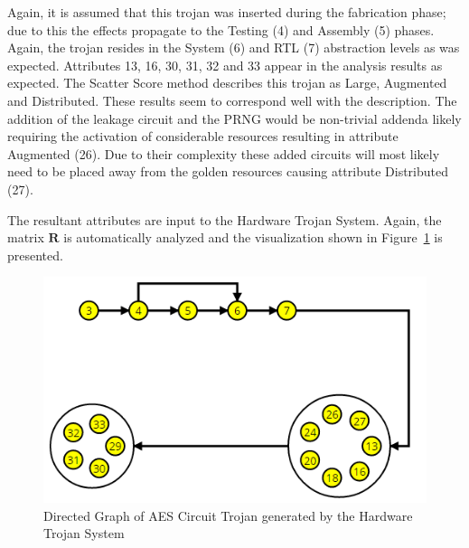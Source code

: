 \documentclass[conference]{IEEEtran}
\newcommand{\WebName}{Hardware Trojan System}
\begin{document}
Again, it is assumed that this trojan was inserted during the fabrication phase; due to this the effects propagate to the Testing (4) and Assembly (5) phases.
Again, the trojan resides in the System (6) and \acrshort{RTL} (7) abstraction levels as was expected.
Attributes 13, 16, 30, 31, 32 and 33 appear in the analysis results as expected.
The Scatter Score method describes this trojan as Large, Augmented and Distributed. 
These results seem to correspond well with the description. 
The addition of the leakage circuit and the PRNG would be non-trivial addenda likely requiring the activation of considerable resources resulting in attribute Augmented (26).
Due to their complexity these added circuits will most likely need to be placed away from the \gls{golden} resources causing attribute Distributed (27).

The resultant attributes are input to the \WebName.
Again, the matrix $\mathbf{R}$ is automatically analyzed and the visualization shown in Figure~\ref{fig:aesVisual} is presented.
\begin{figure}[h]
	\centering
	\includegraphics[width=0.91\linewidth]{Figures/aesVisual}
	\caption{Directed Graph of AES Circuit Trojan generated by the \WebName}
	\label{fig:aesVisual}
\end{figure}

\end{document}
